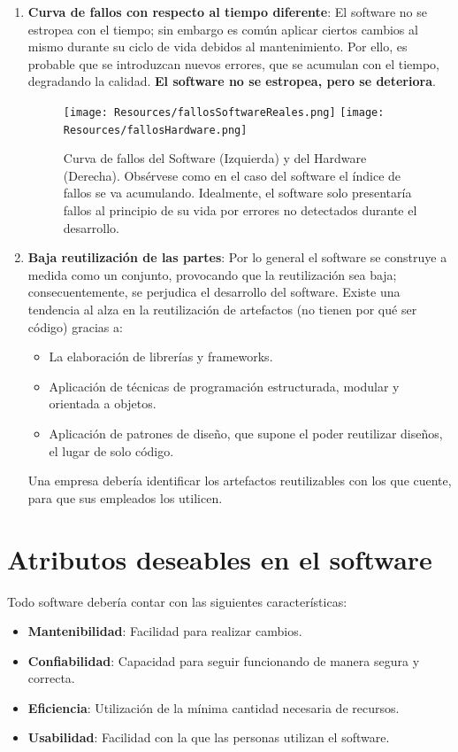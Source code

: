 \begin{enumerate}
    \item \textbf{Curva de fallos con respecto al tiempo diferente}:
          El software no se estropea con el tiempo; sin embargo es común aplicar ciertos cambios al mismo durante su ciclo de vida debidos al mantenimiento. Por ello, es probable que se introduzcan nuevos errores, que se acumulan con el tiempo, degradando la calidad. \textbf{El software no se estropea, pero se deteriora}.
          \begin{figure}[h]
            \centering
            \texttt{[image: Resources/fallosSoftwareReales.png]}
            \texttt{[image: Resources/fallosHardware.png]}
            \caption{Curva de fallos del Software (Izquierda) y del Hardware (Derecha). Obsérvese como en el caso del software el índice de fallos se va acumulando. Idealmente, el software solo presentaría fallos al principio de su vida por errores no detectados durante el desarrollo.}
        \end{figure}
    \item \textbf{Baja reutilización de las partes}:
          Por lo general el software se construye a medida como un conjunto, provocando que la reutilización sea baja; consecuentemente, se perjudica el desarrollo del software. Existe una tendencia al alza en la reutilización de artefactos (no tienen por qué ser código) gracias a:
          \begin{itemize}
              \item La elaboración de librerías y frameworks.
              \item Aplicación de técnicas de programación estructurada, modular y orientada a objetos.
              \item Aplicación de patrones de diseño, que supone el poder reutilizar diseños, el lugar de solo código.
          \end{itemize}
          Una empresa debería identificar los artefactos reutilizables con los que cuente, para que sus empleados los utilicen.
\end{enumerate}

\section{Atributos deseables en el software}
Todo software debería contar con las siguientes características:
\begin{itemize}
    \item \textbf{Mantenibilidad}: Facilidad para realizar cambios.
    \item \textbf{Confiabilidad}: Capacidad para seguir funcionando de manera segura y correcta.
    \item \textbf{Eficiencia}: Utilización de la mínima cantidad necesaria de recursos.
    \item \textbf{Usabilidad}: Facilidad con la que las personas utilizan el software.
\end{itemize}

